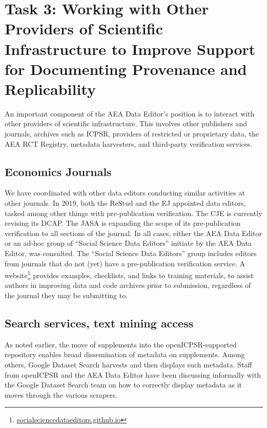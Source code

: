\documentclass[PP]{AEA}
\newcommand{\urlcite}[2]{#2\footnote{\url{#1}}}
\begin{document}
\section{Task 3: Working with Other Providers of Scientific Infrastructure to Improve Support for Documenting Provenance and Replicability}
\label{sec:coordination}

An important component of the AEA Data Editor's position is to interact with other providers of scientific infrastructure. This involves other publishers and journals, archives such as ICPSR, providers of restricted or proprietary data, the AEA RCT Registry, metadata harvesters, and third-party verification services. 

\subsection{Economics Journals}

We have coordinated with other data editors conducting similar activities at other journals. In 2019, both the \ac{ReStud} and the \ac{EJ}  appointed data editors, tasked among other things with pre-publication verification. The \ac{CJE} is currently revising its \ac{DCAP}. The \ac{JASA} is expanding the scope of its pre-publication verification to all sections of the journal. In all cases, either the AEA Data Editor or an ad-hoc group of ``Social Science Data Editors'' initiate by the AEA Data Editor, was consulted. The ``Social Science Data Editors'' group includes  editors from journals that do not (yet) have a pre-publication verification service. A  \urlcite{socialsciencedataeditors.github.io}{website} provides examples, checklists, and links to training materials, to assist authors in  improving data and code archives prior to submission, regardless of the journal they may be submitting to.

\subsection{Search services, text mining access}
As noted earlier, the move of supplements into the openICPSR-supported repository enables broad dissemination of metadata on supplements. Among others, Google Dataset Search harvests and then displays such metadata. Staff from openICPSR and the AEA Data Editor have been discussing informally with the Google Dataset Search team on how to correctly display metadata as it moves through the various scrapers. 
\end{document}
